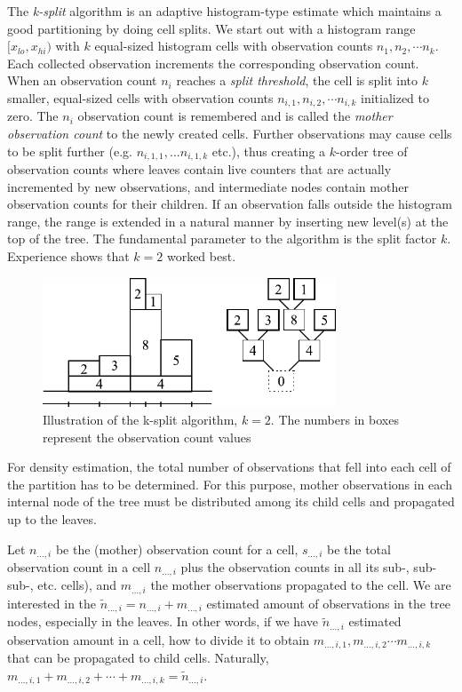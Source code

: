 The \textit{k-split} algorithm is an adaptive histogram-type estimate which
maintains a good partitioning by doing cell splits. We start out with
a histogram range $[x_{lo}, x_{hi})$ with $k$ equal-sized histogram
cells with observation counts $n_1,n_2, \cdots n_k$.  Each collected
observation increments the corresponding observation count. When an
observation count $n_i$ reaches a \textit{split threshold}, the cell
is split into $k$ smaller, equal-sized cells with observation counts
$n_{i,1}, n_{i,2}, \cdots n_{i,k}$ initialized to zero. The $n_i$
observation count is remembered and is called the \textit{mother
  observation count} to the newly created cells. Further observations
may cause cells to be split further (e.g. $n_{i,1,1},...n_{i,1,k}$
etc.), thus creating a $k$-order tree of observation counts where
leaves contain live counters that are actually incremented by new
observations, and intermediate nodes contain mother observation counts
for their children. If an observation falls outside the histogram
range, the range is extended in a natural manner by inserting new
level(s) at the top of the tree. The fundamental parameter to the
algorithm is the split factor $k$. Experience shows that $k=2$ worked best.

\begin{figure}[htbp]
  \begin{center}
    \includegraphics[width=3.442in, height=1.518in]{figures/usmanFig15}
    \caption{Illustration of the k-split algorithm, $k=2$. The
      numbers in boxes represent the observation count values}
  \end{center}
\end{figure}


For density estimation, the total number of observations that
fell into each cell of the partition has to be determined. For
this purpose, mother observations in each internal node of the
tree must be distributed among its child cells and propagated
up to the leaves.


Let $n_{...,i}$ be the (mother) observation count for a cell,
$s_{...,i}$ be the total observation count in a cell $n_{...,i}$ plus
the observation counts in all its sub-, sub-sub-, etc. cells), and
$m_{...,i}$ the mother observations propagated to the cell. We are
interested in the $\tilde{n}_{...,i} = n_{...,i} + m_{...,i}$
estimated amount of observations in the tree nodes, especially in the
leaves. In other words, if we have $\tilde{n}_{...,i}$ estimated
observation amount in a cell, how to divide it to obtain
$m_{...,i,1}, m_{...,i,2} \cdots m_{...,i,k}$
that can be propagated to child cells. Naturally,
$m_{...,i,1} + m_{...,i,2} + \cdots + m_{...,i,k} = \tilde{n}_{...,i}$.

